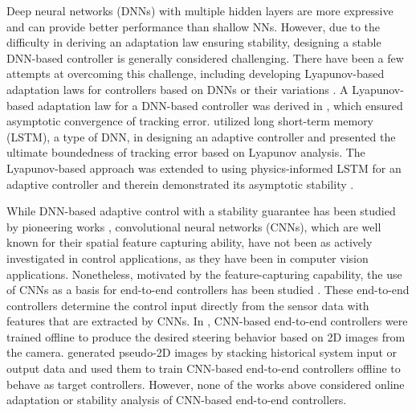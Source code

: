\documentclass{l4dc2025}
\begin{document}
Deep neural networks (DNNs) with multiple hidden layers are more expressive and can provide better performance than shallow NNs. However, due to the difficulty in deriving an adaptation law ensuring stability, designing a stable DNN-based controller is generally considered challenging. There have been a few attempts at overcoming this challenge, including developing Lyapunov-based adaptation laws for controllers based on DNNs or their variations \cite{DixonDNN, DixonLSTM, DixonPINN}. A Lyapunov-based adaptation law for a DNN-based controller was derived in \cite{DixonDNN}, which ensured asymptotic convergence of tracking error. \cite{DixonLSTM} utilized long short-term memory (LSTM), a type of DNN, in designing an adaptive controller and presented the ultimate boundedness of tracking error based on Lyapunov analysis.
The Lyapunov-based approach was extended to using physics-informed LSTM for an adaptive controller and therein demonstrated its asymptotic stability \cite{DixonPINN}.

While DNN-based adaptive control with a stability guarantee has been studied by pioneering works \cite{DixonDNN, DixonLSTM, DixonPINN}, convolutional neural networks (CNNs), which are well known for their spatial feature capturing ability, have not been as actively investigated in control applications, as they have been in computer vision applications.
Nonetheless, motivated by the feature-capturing capability, the use of CNNs as a basis for end-to-end controllers has been studied \cite{CNNimg2strOutErr, CNNimg2strAngErr, CNNmat2mat, CNNsensorSystemCompare}. These end-to-end controllers determine the control input directly from the sensor data with features that are extracted by CNNs. In \cite{CNNimg2strOutErr, CNNimg2strAngErr}, CNN-based end-to-end controllers were trained offline to produce the desired steering behavior based on 2D images from the camera. \cite{CNNmat2mat, CNNsensorSystemCompare} generated pseudo-2D images by stacking historical system input or output data and used them to train CNN-based end-to-end controllers offline to behave as target controllers.
However, none of the works above considered online adaptation or stability analysis of CNN-based end-to-end controllers. 
\end{document}
